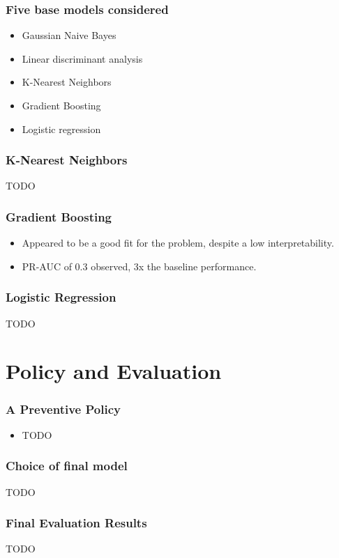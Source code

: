 \documentclass{beamer}
\begin{document}
    \begin{frame}
        \frametitle{Five base models considered}
        \begin{itemize}
                    \item Gaussian Naive Bayes
                    \item Linear discriminant analysis
                    \item K-Nearest Neighbors
                    \item Gradient Boosting
                    \item Logistic regression
        \end{itemize}
    \end{frame}

    \begin{frame}
        \frametitle{K-Nearest Neighbors}
        TODO
    \end{frame}

    \begin{frame}
        \frametitle{Gradient Boosting}
        \begin{itemize}
            \item Appeared to be a good fit for the problem, despite a low interpretability.
            \item PR-AUC of 0.3 observed, 3x the baseline performance.
        \end{itemize}
    \end{frame}

    \begin{frame}
        \frametitle{Logistic Regression}
        TODO
    \end{frame}


    \section{Policy and Evaluation}

    \begin{frame}
        \frametitle{A Preventive Policy}
        \begin{itemize}
            \item TODO
        \end{itemize}
    \end{frame}

    \begin{frame}
        \frametitle{Choice of final model}
        TODO
    \end{frame}
    
    \begin{frame}
        \frametitle{Final Evaluation Results}
        TODO
    \end{frame}
\end{document}

